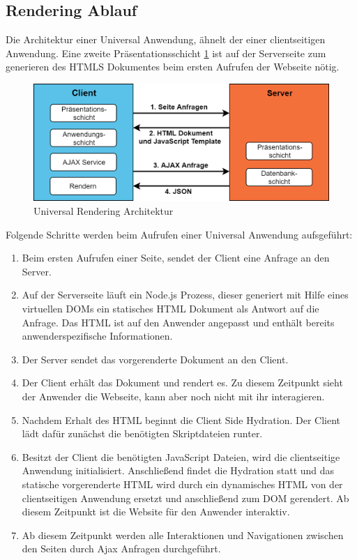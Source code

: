 \documentclass[runningheads]{llncs}
\begin{document}
\subsection{Rendering Ablauf}
\label{subsec:Rendering Ablauf}
Die Architektur einer Universal Anwendung, ähnelt der einer clientseitigen Anwendung. Eine
zweite Präsentationsschicht \ref{Universal Rendering Architektur} ist auf der Serverseite zum generieren des HTMLS Dokumentes beim
ersten Aufrufen der Webseite nötig.
\begin{figure}[h]
  \centering
  \includegraphics[width=12cm]{images/universal}
  \caption{Universal Rendering Architektur}
  \label{Universal Rendering Architektur}
\end{figure}
Folgende Schritte werden beim Aufrufen einer Universal Anwendung aufsgeführt:
\begin{enumerate}
  \setlength\itemsep{1em}
  \item Beim ersten Aufrufen einer Seite, sendet der Client eine Anfrage an den Server.
  \item Auf der Serverseite läuft ein Node.js Prozess, 
  dieser generiert mit Hilfe eines virtuellen DOMs 
  ein statisches HTML Dokument als Antwort auf die Anfrage. 
  Das HTML ist auf den Anwender angepasst und enthält bereits anwenderspezifische Informationen.
  \item Der Server sendet das vorgerenderte Dokument an den Client.
  \item Der Client erhält das Dokument und rendert es. 
  Zu diesem Zeitpunkt sieht der Anwender die Webseite, 
  kann aber noch nicht mit ihr interagieren.
  \item Nachdem Erhalt des HTML beginnt die Client Side Hydration. 
  Der Client lädt dafür zunächst die benötigten Skriptdateien runter.
  \item Besitzt der Client die benötigten JavaScript Dateien, 
  wird die clientseitige Anwendung initialisiert. 
  Anschließend findet die Hydration statt und 
  das statische vorgerenderte HTML wird 
  durch ein dynamisches HTML von der clientseitigen Anwendung ersetzt und 
  anschließend zum DOM gerendert. 
  Ab diesem Zeitpunkt ist die Website für den Anwender interaktiv.
  \item Ab diesem Zeitpunkt werden alle Interaktionen und 
  Navigationen zwischen den Seiten durch Ajax Anfragen durchgeführt.
\end{enumerate}
\end{document}
